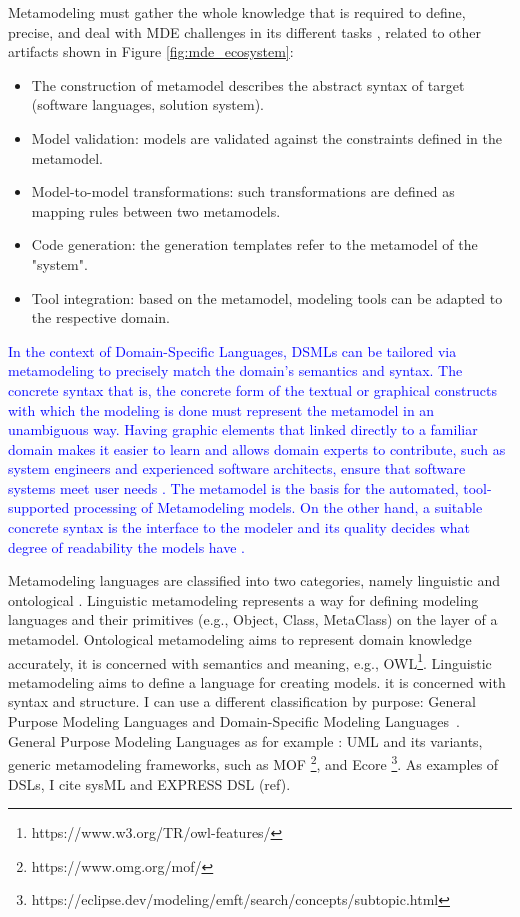 Metamodeling must gather the whole  knowledge that is required to define, precise, and deal with MDE challenges in its different tasks \cite{wortmann2020modeling}, related to other artifacts shown in Figure \ref{fig:mde_ecosystem}:

\begin{itemize}
\item The construction of metamodel describes the abstract syntax of target (software languages, solution system).
\item Model validation: models are validated against the constraints defined in the metamodel. 
\item Model-to-model transformations: such transformations are defined as mapping rules between two metamodels.
\item Code generation: the generation templates refer to the metamodel of the "system". 
\item Tool integration: based on the metamodel, modeling tools can be adapted to the respective domain. 
\end{itemize}

\textcolor{blue}{
In the context of Domain-Specific Languages, DSMLs can be tailored via metamodeling to precisely match the domain's semantics and syntax. The concrete syntax that is, the concrete form of the textual or graphical constructs with which the modeling is done must represent the metamodel in an unambiguous way. Having graphic elements that linked directly to a familiar domain makes it easier to learn and allows domain  experts to contribute, such as system engineers and experienced software architects, ensure that software systems meet user needs \cite{volter2013model}. The metamodel is the basis for the automated, tool-supported processing of Metamodeling models. On the other hand, a suitable concrete syntax is the interface to the modeler and its quality decides what degree of readability the models have \cite{stahl2006model}.
}


Metamodeling languages are classified into two categories, namely linguistic and ontological \cite{gavsevic2007metamodeling}. Linguistic metamodeling represents a way for defining modeling languages and their primitives (e.g., Object, Class, MetaClass) on the layer of a metamodel. Ontological metamodeling aims to represent domain knowledge accurately, it is concerned with semantics and meaning, e.g., OWL\footnote{https://www.w3.org/TR/owl-features/}. Linguistic metamodeling aims to define a language for creating models. it is concerned with syntax and structure.
I can use a different classification by purpose: General Purpose Modeling Languages and Domain-Specific Modeling Languages~\cite{de2012domain}. General Purpose Modeling Languages as for example : UML and its variants, generic metamodeling frameworks, such as MOF \footnote{https://www.omg.org/mof/}, and Ecore \footnote{https://eclipse.dev/modeling/emft/search/concepts/subtopic.html}. As examples of DSLs, I cite sysML and EXPRESS DSL (ref).

